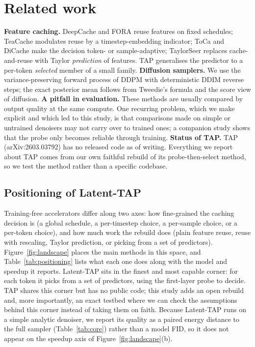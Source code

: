 \documentclass[10pt,twocolumn]{article}
\begin{document}
\section{Related work}
\textbf{Feature caching.} DeepCache\cite{ma2024deepcache} and FORA\cite{selvaraju2024fora}
reuse features on fixed schedules; TeaCache\cite{liu2024teacache} modulates reuse by a
timestep-embedding indicator; ToCa\cite{zou2024toca} and DiCache\cite{dicache2025} make
the decision token- or sample-adaptive; TaylorSeer\cite{taylorseer2025} replaces
cache-and-reuse with Taylor \emph{prediction} of features. TAP generalises the predictor to
a per-token \emph{selected} member of a small family. \textbf{Diffusion samplers.} We use
the variance-preserving forward process of DDPM\cite{ho2020ddpm} with deterministic
DDIM\cite{song2021ddim} reverse steps; the exact posterior mean follows from
Tweedie's formula\cite{efron2011tweedie} and the score view of
diffusion\cite{song2019generative,song2021sde}. \textbf{A pitfall in evaluation.} These
methods are usually compared by output quality at the same compute. One recurring problem,
which we make explicit and which led to this study, is that comparisons made on simple or
untrained denoisers may not carry over to trained ones; a companion study shows that the
probe only becomes reliable through training\cite{challagundla2025probe}. \textbf{Status of
TAP.} TAP (arXiv:2603.03792) has no released code as of writing. Everything we report about
TAP comes from our own faithful rebuild of its probe-then-select method, so we test the
method rather than a specific codebase.

\subsection{Positioning of Latent-TAP}\label{sec:positioning}
Training-free accelerators differ along two axes: how fine-grained the caching decision is
(a global schedule, a per-timestep choice, a per-sample choice, or a per-token choice), and
how much work the rebuild does (plain feature reuse, reuse with rescaling, Taylor
prediction, or picking from a set of predictors). Figure~\ref{fig:landscape} places the main
methods in this space, and Table~\ref{tab:positioning} lists what each one does along with
the model and speedup it reports. Latent-TAP sits in the finest and most capable corner: for
each token it picks from a set of predictors, using the first-layer probe to decide. TAP
shares this corner but has no public code; this study adds an open rebuild and, more
importantly, an exact testbed where we can check the assumptions behind this corner instead
of taking them on faith. Because Latent-TAP runs on a simple analytic denoiser, we report
its quality as a paired energy distance to the full sampler (Table~\ref{tab:core}) rather
than a model FID, so it does not appear on the speedup axis of Figure~\ref{fig:landscape}(b).
\end{document}
